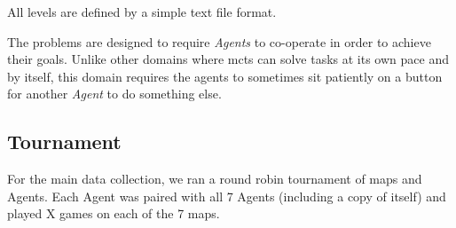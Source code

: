 \documentclass{IEEEtran}
\begin{document}
All levels are defined by a simple text file format.

The problems are designed to require \emph{Agents} to co-operate in order to achieve their goals. Unlike other domains where \gls{mcts} can solve tasks at its own pace and by itself, this domain requires the agents to sometimes sit patiently on a button for another \emph{Agent} to do something else.

\subsection{Tournament}
For the main data collection, we ran a round robin tournament of maps and Agents. Each Agent was paired with all 7 Agents (including a copy of itself) and played X games on each of the 7 maps. 
\end{document}

